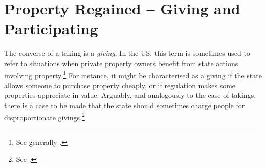 {{%



}

\section{Property Regained -- Giving and Participating}\label{sec:7:2}

The converse of a taking is a {\it giving}. In the US, this term is sometimes used to refer to situations when private property owners benefit from state actions involving property.\footnote{See generally \cite{bell01}.} For instance, it might be characterised as a giving if the state allows someone to purchase property cheaply, or if regulation makes some properties appreciate in value. Arguably, and analogously to the case of takings, there is a case to be made that the state should sometimes charge people for disproportionate givings.\footnote{See \cite[590-604]{bell01}.}

}
